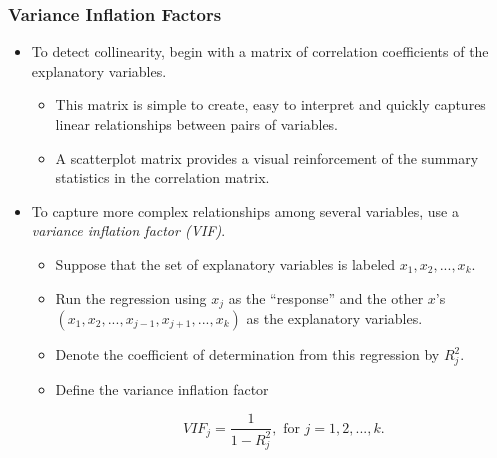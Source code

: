 \begin{frame}%
 \frametitle{Variance Inflation Factors}
 \begin{itemize}
   \item To detect collinearity, begin with a matrix of correlation
coefficients of the explanatory variables.
 \begin{itemize}
   \item This matrix is simple to
create, easy to interpret and quickly captures linear relationships
between pairs of variables.
 \item A scatterplot matrix provides a visual
reinforcement of the summary statistics in the correlation matrix.
    \end{itemize}
\item To capture more complex relationships
among several variables, use a \textit{variance inflation factor
(VIF)}.
 \begin{itemize}
   \item Suppose that the set of
explanatory variables is labeled $x_{1},x_{2},...,x_{k}$.
\item Run
the regression using $x_{j}$ as
the ``response'' and the other $x$'s $%
(x_{1},x_{2},...,x_{j-1},x_{j+1},...,x_{k})$ as the explanatory
variables.
\item Denote the coefficient of determination from this
regression by $R_j^2$.
\item Define the variance inflation factor

\begin{equation*}
VIF_{j}=\frac{1}{1-R_{j}^{2}},\text{ \ \ \ for \ }j=1,2,...,k.
\end{equation*}
    \end{itemize}   \end{itemize}
\end{frame}


